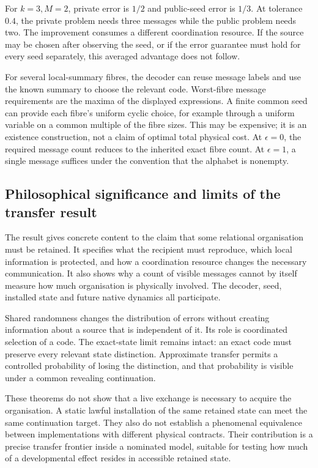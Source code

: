 \documentclass[
  11pt,
  a4paper,
]{article}
\begin{document}
For \(k=3,M=2\), private error is \(1/2\) and public-seed error is
\(1/3\). At tolerance \(0.4\), the private problem needs three messages
while the public problem needs two. The improvement consumes a different
coordination resource. If the source may be chosen after observing the
seed, or if the error guarantee must hold for every seed separately,
this averaged advantage does not follow.

For several local-summary fibres, the decoder can reuse message labels
and use the known summary to choose the relevant code. Worst-fibre
message requirements are the maxima of the displayed expressions. A
finite common seed can provide each fibre's uniform cyclic choice, for
example through a uniform variable on a common multiple of the fibre
sizes. This may be expensive; it is an existence construction, not a
claim of optimal total physical cost. At \(\epsilon=0\), the required
message count reduces to the inherited exact fibre count. At
\(\epsilon=1\), a single message suffices under the convention that the
alphabet is nonempty.

\subsection{Philosophical significance and limits of the transfer
result}\label{philosophical-significance-and-limits-of-the-transfer-result}

The result gives concrete content to the claim that some relational
organisation must be retained. It specifies what the recipient must
reproduce, which local information is protected, and how a coordination
resource changes the necessary communication. It also shows why a count
of visible messages cannot by itself measure how much organisation is
physically involved. The decoder, seed, installed state and future
native dynamics all participate.

Shared randomness changes the distribution of errors without creating
information about a source that is independent of it. Its role is
coordinated selection of a code. The exact-state limit remains intact:
an exact code must preserve every relevant state distinction.
Approximate transfer permits a controlled probability of losing the
distinction, and that probability is visible under a common revealing
continuation.

These theorems do not show that a live exchange is necessary to acquire
the organisation. A static lawful installation of the same retained
state can meet the same continuation target. They also do not establish
a phenomenal equivalence between implementations with different physical
contracts. Their contribution is a precise transfer frontier inside a
nominated model, suitable for testing how much of a developmental effect
resides in accessible retained state.
\end{document}
